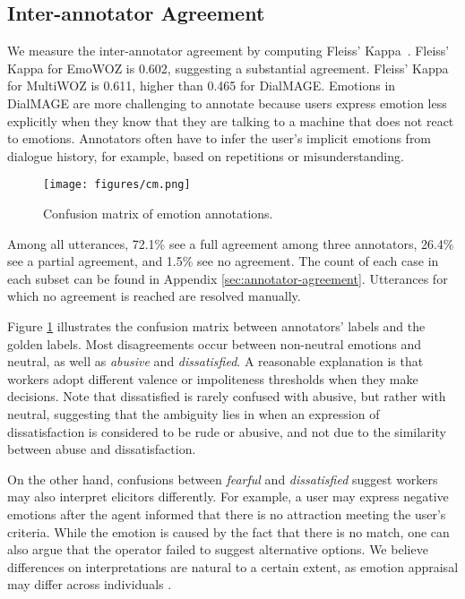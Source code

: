 \documentclass[10pt, a4paper]{article}
\begin{document}
\subsection{Inter-annotator Agreement}
We measure the inter-annotator agreement by computing Fleiss' Kappa~\cite{fleiss1971measuring}. Fleiss' Kappa for EmoWOZ is 0.602, suggesting a substantial agreement. Fleiss' Kappa for MultiWOZ is 0.611, higher than 0.465 for DialMAGE. Emotions in DialMAGE are more challenging to annotate because users express emotion less explicitly when they know that they are talking to a machine that does not react to emotions. Annotators often have to infer the user's implicit emotions from dialogue history, for example, based on repetitions or misunderstanding.\par

\begin{figure}[!htbp]
\centering
\texttt{[image: figures/cm.png]}
\vspace*{-3mm}
\caption{Confusion matrix of emotion annotations.}
\label{fig:annotator-cm}
\vspace*{-3mm}
\end{figure}
    
Among all utterances, 72.1\% see a full agreement among three annotators, 26.4\% see a partial agreement, and 1.5\% see no agreement. The count of each case in each subset can be found in Appendix \ref{sec:annotator-agreement}. Utterances for which no agreement is reached are resolved manually.

Figure \ref{fig:annotator-cm} illustrates the confusion matrix between annotators' labels and the golden labels. Most disagreements occur between non-neutral emotions and neutral, as well as \textit{abusive} and \textit{dissatisfied}. A reasonable explanation is that workers adopt different valence or impoliteness thresholds when they make decisions. Note that dissatisfied is rarely confused with abusive, but rather with neutral, suggesting that the ambiguity lies in when an expression of dissatisfaction is considered to be rude or abusive, and not due to the similarity between abuse and dissatisfaction.

On the other hand, confusions between \textit{fearful} and \textit{dissatisfied} suggest workers may also interpret elicitors differently.
For example, a user may express negative emotions after the agent informed that there is no attraction meeting the user's criteria. While the emotion is caused by the fact that there is no match, one can also argue that the operator failed to suggest alternative options. We believe differences on interpretations are natural to a certain extent, as emotion appraisal may differ across individuals \cite{kuppens2007individual}. 
\end{document}
